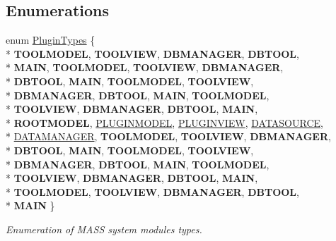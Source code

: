\subsection*{Enumerations}
\begin{DoxyCompactItemize}
\item 
enum \hyperlink{group___main_menu_module_ga9b3bee49ce70df90694056c2f48c2e77}{Plugin\+Types} \{ \\*
{\bfseries T\+O\+O\+L\+M\+O\+D\+EL}, 
{\bfseries T\+O\+O\+L\+V\+I\+EW}, 
{\bfseries D\+B\+M\+A\+N\+A\+G\+ER}, 
{\bfseries D\+B\+T\+O\+OL}, 
\\*
{\bfseries M\+A\+IN}, 
{\bfseries T\+O\+O\+L\+M\+O\+D\+EL}, 
{\bfseries T\+O\+O\+L\+V\+I\+EW}, 
{\bfseries D\+B\+M\+A\+N\+A\+G\+ER}, 
\\*
{\bfseries D\+B\+T\+O\+OL}, 
{\bfseries M\+A\+IN}, 
{\bfseries T\+O\+O\+L\+M\+O\+D\+EL}, 
{\bfseries T\+O\+O\+L\+V\+I\+EW}, 
\\*
{\bfseries D\+B\+M\+A\+N\+A\+G\+ER}, 
{\bfseries D\+B\+T\+O\+OL}, 
{\bfseries M\+A\+IN}, 
{\bfseries T\+O\+O\+L\+M\+O\+D\+EL}, 
\\*
{\bfseries T\+O\+O\+L\+V\+I\+EW}, 
{\bfseries D\+B\+M\+A\+N\+A\+G\+ER}, 
{\bfseries D\+B\+T\+O\+OL}, 
{\bfseries M\+A\+IN}, 
\\*
{\bfseries R\+O\+O\+T\+M\+O\+D\+EL}, 
\hyperlink{group___main_menu_module_ga9b3bee49ce70df90694056c2f48c2e77af2331764548e4dc1ba306a7f1e4ac028}{P\+L\+U\+G\+I\+N\+M\+O\+D\+EL}, 
\hyperlink{group___main_menu_module_ga9b3bee49ce70df90694056c2f48c2e77aec2c5b4d67821ae43397a2281c859dfd}{P\+L\+U\+G\+I\+N\+V\+I\+EW}, 
\hyperlink{group___main_menu_module_ga9b3bee49ce70df90694056c2f48c2e77af386d829790c833a6448d5d31876f605}{D\+A\+T\+A\+S\+O\+U\+R\+CE}, 
\\*
\hyperlink{group___main_menu_module_ga9b3bee49ce70df90694056c2f48c2e77a159bdb590669738efbe7ea1ac03d835e}{D\+A\+T\+A\+M\+A\+N\+A\+G\+ER}, 
{\bfseries T\+O\+O\+L\+M\+O\+D\+EL}, 
{\bfseries T\+O\+O\+L\+V\+I\+EW}, 
{\bfseries D\+B\+M\+A\+N\+A\+G\+ER}, 
\\*
{\bfseries D\+B\+T\+O\+OL}, 
{\bfseries M\+A\+IN}, 
{\bfseries T\+O\+O\+L\+M\+O\+D\+EL}, 
{\bfseries T\+O\+O\+L\+V\+I\+EW}, 
\\*
{\bfseries D\+B\+M\+A\+N\+A\+G\+ER}, 
{\bfseries D\+B\+T\+O\+OL}, 
{\bfseries M\+A\+IN}, 
{\bfseries T\+O\+O\+L\+M\+O\+D\+EL}, 
\\*
{\bfseries T\+O\+O\+L\+V\+I\+EW}, 
{\bfseries D\+B\+M\+A\+N\+A\+G\+ER}, 
{\bfseries D\+B\+T\+O\+OL}, 
{\bfseries M\+A\+IN}, 
\\*
{\bfseries T\+O\+O\+L\+M\+O\+D\+EL}, 
{\bfseries T\+O\+O\+L\+V\+I\+EW}, 
{\bfseries D\+B\+M\+A\+N\+A\+G\+ER}, 
{\bfseries D\+B\+T\+O\+OL}, 
\\*
{\bfseries M\+A\+IN}
 \}\begin{DoxyCompactList}\small\item\em Enumeration of M\+A\+SS system modules types. \end{DoxyCompactList}
\end{DoxyCompactItemize}


